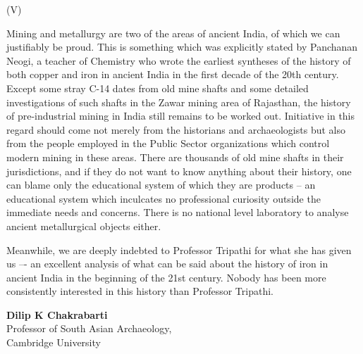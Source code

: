 \begin{center}
(V)
\end{center}

Mining and metallurgy are two of the areas of ancient India, of which we can justifiably be proud. This is something which was explicitly stated by Panchanan Neogi, a teacher of Chemistry who wrote the earliest syntheses of the history of both copper and iron in ancient India in the first decade of the 20th century. Except some stray C-14 dates from old mine shafts and some detailed investigations of such shafts in the Zawar mining area of Rajasthan, the history of pre-industrial mining in India still remains to be worked out. Initiative in this regard should come not merely from the historians and archaeologists but also from the people employed in the Public Sector organizations which control modern mining in these areas. There are thousands of old mine shafts in their jurisdictions, and if they do not want to know anything about their history, one can blame only the educational system of which they are products – an educational system which inculcates no professional curiosity outside the immediate needs and concerns. There is no national level laboratory to analyse ancient metallurgical objects either.

Meanwhile, we are deeply indebted to Professor Tripathi for what she has given us –- an excellent analysis of what can be said about the history of iron in ancient India in the beginning of the 21st century. Nobody has been more consistently interested in this history than Professor Tripathi.

\begin{flushright}
\textbf{Dilip K Chakrabarti }\\ Professor of South Asian Archaeology, \\ Cambridge University
\end{flushright}

